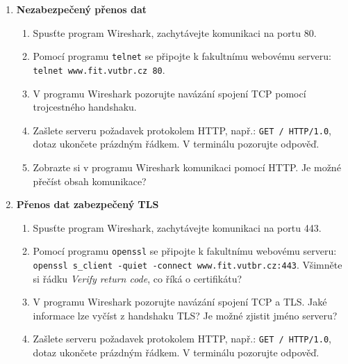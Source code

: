 \documentclass[a4paper,11pt]{article}
\begin{document}
\begin{enumerate}

  \item {\bf  Nezabezpečený přenos dat}

    \begin{enumerate}

      \item Spusťte program Wireshark, zachytávejte komunikaci na portu 80.

      \item Pomocí programu {\tt telnet} se připojte k fakultnímu webovému
        serveru: \\ \verb|telnet www.fit.vutbr.cz 80|.

      \item V programu Wireshark pozorujte navázání spojení TCP pomocí
        trojcestného handshaku.

      \item Zašlete serveru požadavek protokolem HTTP, např.:
        \verb|GET / HTTP/1.0|, dotaz ukončete prázdným řádkem. V terminálu pozorujte
        odpověď.

      \item Zobrazte si v programu Wireshark komunikaci pomocí HTTP. Je možné
        přečíst obsah komunikace?

    \end{enumerate}

  \item {\bf Přenos dat zabezpečený TLS}

    \begin{enumerate}

      \item Spusťte program Wireshark, zachytávejte komunikaci na portu 443.

      \item Pomocí programu {\tt openssl} se připojte k fakultnímu webovému
        serveru: \\ \verb|openssl s_client -quiet -connect www.fit.vutbr.cz:443|.
        Všimněte si řádku \emph{Verify return code}, co
        říká o certifikátu?

      \item V programu Wireshark pozorujte navázání spojení TCP a TLS. Jaké
        informace lze vyčíst z handshaku TLS? Je možné zjistit jméno serveru?

      \item Zašlete serveru požadavek protokolem HTTP, např.:
        \verb|GET / HTTP/1.0|, dotaz ukončete prázdným řádkem. V terminálu pozorujte
        odpověď.


\end{enumerate}
\end{enumerate}
\end{document}
